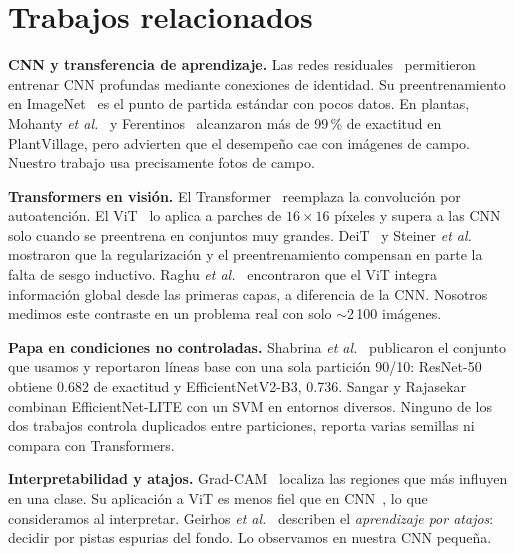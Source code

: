 \documentclass[conference,a4paper]{IEEEtran}
\begin{document}
\section{Trabajos relacionados}
\textbf{CNN y transferencia de aprendizaje.} Las redes residuales~\cite{he2016resnet} permitieron entrenar CNN profundas mediante conexiones de identidad. Su preentrenamiento en ImageNet~\cite{deng2009imagenet} es el punto de partida estándar con pocos datos. En plantas, Mohanty \textit{et al.}~\cite{mohanty2016plant} y Ferentinos~\cite{ferentinos2018plant} alcanzaron más de 99\,\% de exactitud en PlantVillage, pero advierten que el desempeño cae con imágenes de campo. Nuestro trabajo usa precisamente fotos de campo.

\textbf{Transformers en visión.} El Transformer~\cite{vaswani2017attention} reemplaza la convolución por autoatención. El ViT~\cite{dosovitskiy2021vit} lo aplica a parches de $16\times16$ píxeles y supera a las CNN solo cuando se preentrena en conjuntos muy grandes. DeiT~\cite{touvron2021deit} y Steiner \textit{et al.}~\cite{steiner2022howtotrain} mostraron que la regularización y el preentrenamiento compensan en parte la falta de sesgo inductivo. Raghu \textit{et al.}~\cite{raghu2021vitsee} encontraron que el ViT integra información global desde las primeras capas, a diferencia de la CNN. Nosotros medimos este contraste en un problema real con solo $\sim$2\,100 imágenes.

\textbf{Papa en condiciones no controladas.} Shabrina \textit{et al.}~\cite{shabrina2024potato} publicaron el conjunto que usamos y reportaron líneas base con una sola partición 90/10: ResNet-50 obtiene 0.682 de exactitud y EfficientNetV2-B3, 0.736. Sangar y Rajasekar~\cite{sangar2025potato} combinan EfficientNet-LITE con un SVM en entornos diversos. Ninguno de los dos trabajos controla duplicados entre particiones, reporta varias semillas ni compara con Transformers.

\textbf{Interpretabilidad y atajos.} Grad-CAM~\cite{selvaraju2017gradcam} localiza las regiones que más influyen en una clase. Su aplicación a ViT es menos fiel que en CNN~\cite{chefer2021transformer}, lo que consideramos al interpretar. Geirhos \textit{et al.}~\cite{geirhos2020shortcut} describen el \emph{aprendizaje por atajos}: decidir por pistas espurias del fondo. Lo observamos en nuestra CNN pequeña.

\end{document}
